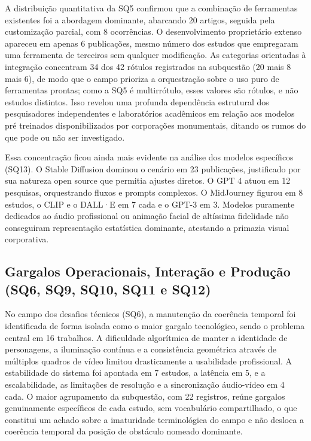 A distribuição quantitativa da SQ5 confirmou que a combinação de ferramentas existentes foi a abordagem dominante, abarcando 20 artigos, seguida pela customização parcial, com 8 ocorrências. O desenvolvimento proprietário extenso apareceu em apenas 6 publicações, mesmo número dos estudos que empregaram uma ferramenta de terceiros sem qualquer modificação. As categorias orientadas à integração concentram 34 dos 42 rótulos registrados na subquestão (20 mais 8 mais 6), de modo que o campo prioriza a orquestração sobre o uso puro de ferramentas prontas; como a SQ5 é multirrótulo, esses valores são rótulos, e não estudos distintos. Isso revelou uma profunda dependência estrutural dos pesquisadores independentes e laboratórios acadêmicos em relação aos modelos pré treinados disponibilizados por corporações monumentais, ditando os rumos do que pode ou não ser investigado.

Essa concentração ficou ainda mais evidente na análise dos modelos específicos (SQ13). O Stable Diffusion dominou o cenário em 23 publicações, justificado por sua natureza open source que permitia ajustes diretos. O GPT 4 atuou em 12 pesquisas, orquestrando fluxos e prompts complexos. O MidJourney figurou em 8 estudos, o CLIP e o DALL·E em 7 cada e o GPT-3 em 3. Modelos puramente dedicados ao áudio profissional ou animação facial de altíssima fidelidade não conseguiram representação estatística dominante, atestando a primazia visual corporativa.

\subsection{Gargalos Operacionais, Interação e Produção (SQ6, SQ9, SQ10, SQ11 e SQ12)}

No campo dos desafios técnicos (SQ6), a manutenção da coerência temporal foi identificada de forma isolada como o maior gargalo tecnológico, sendo o problema central em 16 trabalhos. A dificuldade algorítmica de manter a identidade de personagens, a iluminação contínua e a consistência geométrica através de múltiplos quadros de vídeo limitou drasticamente a usabilidade profissional. A estabilidade do sistema foi apontada em 7 estudos, a latência em 5, e a escalabilidade, as limitações de resolução e a sincronização áudio-vídeo em 4 cada. O maior agrupamento da subquestão, com 22 registros, reúne gargalos genuinamente específicos de cada estudo, sem vocabulário compartilhado, o que constitui um achado sobre a imaturidade terminológica do campo e não desloca a coerência temporal da posição de obstáculo nomeado dominante.

